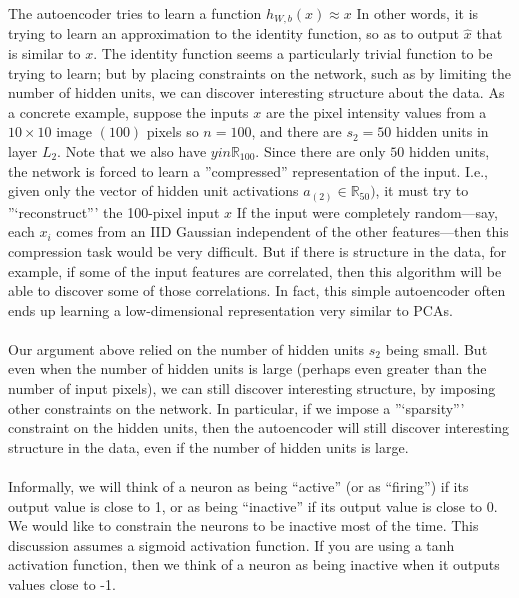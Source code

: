 \documentclass[conference]{IEEEtran}
\begin{document}
The autoencoder tries to learn a function $h_{W,b}(x) \approx x $  In other words, 
it is trying to learn an approximation to the identity function, so as to output
$\hat{x}$ that is similar to $x$. The identity function seems a particularly trivial function to be trying to learn; but by placing constraints on the network, such as by limiting the number of hidden units, we can discover interesting structure about the data. As a concrete example, suppose 
the inputs $x$ are the pixel intensity values from a $10 \times 10$ image $(100)$ pixels so
$n = 100$, and there are $s_2 = 50$ hidden units in layer $L_2$. Note that we also have $y in \mathbb{R}_100$.
Since there are only $50$ hidden units, the network is forced to learn a ”compressed” representation of the input. 
I.e., given only the vector of hidden unit activations $a_{(2)} \in \mathbb{R}_50 )$, 
it must try to ”‘reconstruct”’ the 100-pixel input $x$ If the input were completely random—say, each $x_i$
comes from an IID Gaussian independent of the other features—then this compression task would be very difficult.
But if there is structure in the data, for example, if some of the input features are correlated, then this algorithm will be able to discover some of those correlations. 
In fact, this simple autoencoder often ends up learning a low-dimensional representation very similar to PCAs.
\\
\paragraph{}
Our argument above relied on the number of hidden units $s_2$
being small. But even when the number of hidden units is large (perhaps even greater than the number of input pixels), we can still discover interesting structure, by imposing other constraints on the network. In particular, if we impose a ”‘sparsity”’ constraint on the hidden units, then the autoencoder will still 
discover interesting structure in the data, even if the number of hidden units is large.\\

\paragraph{}
Informally, we will think of a neuron as being “active” 
(or as “firing”) if its output value is close to 1, 
or as being “inactive” if its output value is close to 0. 
We would like to constrain the neurons to be inactive most of the time. This discussion assumes a sigmoid activation function. If you are using a tanh activation function, then we think of a neuron as being inactive when it outputs values close to -1.\\
\end{document}
